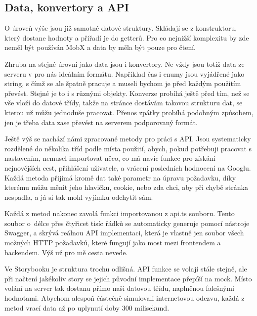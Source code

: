 \subsection{Data, konvertory a API}
O úroveň výše jsou již samotné datové struktury. Skládají se z konstruktoru, který dostane hodnoty a přiřadí je do getterů. Pro co nejnižší komplexitu by zde neměl být používán MobX a data by měla být pouze pro čtení.

Zhruba na stejné úrovni jako data jsou i konvertory. Ne vždy jsou totiž data ze serveru v pro nás ideálním formátu. Například čas i enumy jsou vyjádřené jako string, s čímž se ale špatně pracuje a museli bychom je před každým použitím převést. Stejné je to i s různými objekty. Konverze probíhá ještě před tím, než se vše vloží do datové třídy, takže na stránce dostávám takovou strukturu dat, se kterou už můžu jednoduše pracovat. Přenos zpátky probíhá podobným způsobem, jen je třeba data zase převést na serverem podporovaný formát.

Ještě výš se nachází námi zpracované metody pro práci s API. Jsou systematicky rozdělené do několika tříd podle místa použití, abych, pokud potřebuji pracovat s nastavením, nemusel importovat něco, co má navíc funkce pro získání nejnovějších cest, přihlášení uživatele, a vrácení posledních hodnocení na Googlu. Každá metoda přijímá kromě dat také parametr na úpravu požadavku, díky kterému můžu měnit jeho hlavičku, cookie, nebo zda chci, aby při chybě stránka nespadla, a já si tak mohl vyjímku odchytit sám.

Každá z metod nakonec zavolá funkci importovanou z api.ts souboru. Tento soubor o~délce přes čtyřicet tisíc řádků se automaticky generuje pomocí nástroje Swagger, a skrývá reálnou API implementaci, která je vlastně jen soubor všech možných HTTP požadavků, které fungují jako most mezi frontendem a backendem. Výš už pro mě cesta nevede.

Ve Storybooku je struktura trochu odlišná. API funkce se volají stále stejně, ale při načtení jakékoliv story se jejich původní implementace přepíší na mock. 
Místo volání na server tak dostanu přímo naši datovou třídu, naplněnou falešnými hodnotami. Abychom alespoň částečně simulovali internetovou odezvu, každá z metod vrací data až po uplynutí doby 300 milisekund.